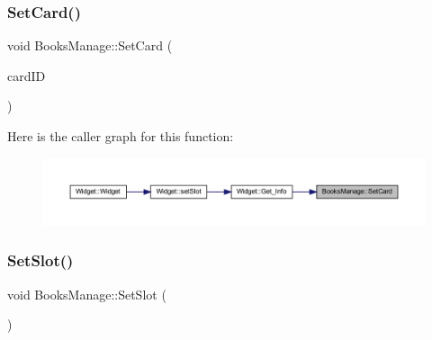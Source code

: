\subsubsection{\texorpdfstring{SetCard()}{SetCard()}}
{\footnotesize\ttfamily void Books\+Manage\+::\+Set\+Card (\begin{DoxyParamCaption}\item[{Q\+String}]{card\+ID }\end{DoxyParamCaption})}

Here is the caller graph for this function\+:
\nopagebreak
\begin{figure}[H]
\begin{center}
\leavevmode
\includegraphics[width=350pt]{class_books_manage_a009c231a6f8976be927b7acfdc4d4591_icgraph}
\end{center}
\end{figure}
\mbox{\label{class_books_manage_a0ee0a3e432c7789497c17758d1f82fdf}} 
\subsubsection{\texorpdfstring{SetSlot()}{SetSlot()}}
{\footnotesize\ttfamily void Books\+Manage\+::\+Set\+Slot (\begin{DoxyParamCaption}{ }\end{DoxyParamCaption})}


